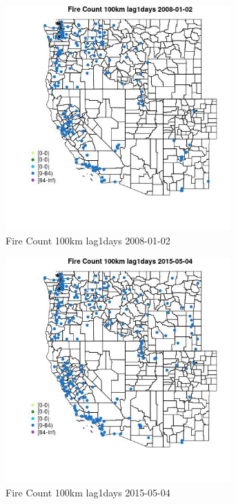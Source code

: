 \begin{figure} 
\centering  
\includegraphics[width=0.77\textwidth]{Code_Outputs/Report_ML_input_PM25_Step4_part_e_de_duplicated_aves_compiled_2019-05-18wNAs_MapObsFire_Count_100km_lag1days2008-01-02.jpg} 
\caption{\label{fig:Report_ML_input_PM25_Step4_part_e_de_duplicated_aves_compiled_2019-05-18wNAsMapObsFire_Count_100km_lag1days2008-01-02}Fire Count 100km lag1days 2008-01-02} 
\end{figure} 
 

\begin{figure} 
\centering  
\includegraphics[width=0.77\textwidth]{Code_Outputs/Report_ML_input_PM25_Step4_part_e_de_duplicated_aves_compiled_2019-05-18wNAs_MapObsFire_Count_100km_lag1days2015-05-04.jpg} 
\caption{\label{fig:Report_ML_input_PM25_Step4_part_e_de_duplicated_aves_compiled_2019-05-18wNAsMapObsFire_Count_100km_lag1days2015-05-04}Fire Count 100km lag1days 2015-05-04} 
\end{figure} 
 

